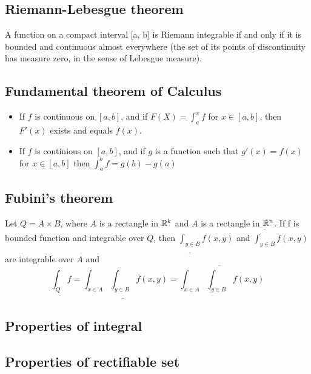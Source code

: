 


\subsection{Riemann-Lebesgue theorem}
A function on a compact interval [a, b] is Riemann integrable if and only if it is bounded and continuous almost everywhere (the set of its points of discontinuity has measure zero, in the sense of Lebesgue measure).


\subsection{Fundamental theorem of Calculus}
\begin{itemize}
\item
	If $f$ is continuous on $[a, b]$, and if $F(X)=\int_a^x f$
	for $x\in[a,b]$, then $F'(x)$ exists and equals $f(x)$.
\item
	If $f$ is continious on $[a, b]$,
	and if $g$ is a function such that
	$g'(x)=f(x)$ for $x\in[a,b]$ then $\int_a^b f = g(b) - g(a)$
\end{itemize}


\subsection{Fubini's theorem}
Let $Q=A\times B$, where $A$ is a rectangle in ${\mathbb R}^k$ and $A$ is a rectangle in ${\mathbb R}^n$.
If f is bounded function and integrable over $Q$, then
$\underline{\int_{y\in B}} f(x,y)$ and $\overline{\int_{y\in B}} f(x,y)$ are integrable over $A$
and
\[\int_Q f = \int_{x\in A}\underline{\int_{y\in B}} f(x,y) = \int_{x\in A}\overline{\int_{y\in B}} f(x,y)\]

\subsection{Properties of integral}
\TODO
\subsection{Properties of rectifiable set}
\TODO

